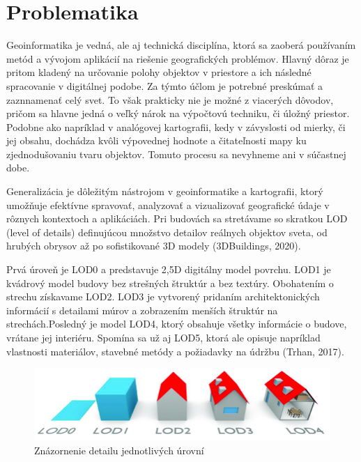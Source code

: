 \documentclass[12pt]{article}
\begin{document}
\newpage

\section*{Problematika}
Geoinformatika je vedná, ale aj technická disciplína, ktorá sa zaoberá používaním metód a vývojom aplikácií na riešenie geografických problémov. Hlavný dôraz je pritom kladený na určovanie polohy objektov v priestore a ich následné spracovanie v digitálnej podobe. Za týmto účlom je potrebné  preskúmať a zaznnamenať celý svet. To však prakticky nie je možné z viacerých dôvodov, pričom sa hlavne jedná o veľký nárok na výpočtovú techniku, či úložný priestor. Podobne ako napríklad v analógovej kartografii, kedy v závyslosti od mierky, či jej obsahu, dochádza kvôli výpovednej hodnote  a čitateľnosti mapy  ku zjednodušovaniu tvaru objektov. Tomuto procesu sa nevyhneme ani v súčastnej dobe.

Generalizácia je dôležitým nástrojom v geoinformatike a kartografii, ktorý umožňuje efektívne spravovať, analyzovať a vizualizovať geografické údaje v rôznych kontextoch a aplikáciách. Pri budovách sa stretávame so skratkou LOD (level of details) definujúcou množstvo detailov reálnych objektov sveta, od hrubých obrysov až po sofistikované 3D modely (3DBuildings, 2020). \par Prvá úroveň je LOD0 a predstavuje 2,5D digitálny model povrchu. LOD1 je kvádrový model budovy bez strešných štruktúr a bez textúry. Obohatením o strechu získavame LOD2. LOD3 je vytvorený pridaním architektonických informácií s detailami múrov a zobrazením menších štruktúr na strechách.Posledný je model LOD4, ktorý obsahuje všetky informácie o budove, vrátane jej interiéru. Spomína sa už aj LOD5, ktorá ale opisuje napríklad vlastnosti materiálov, stavebné metódy a požiadavky na údržbu (Trhan, 2017).
\begin{figure} [h]
    \centering
    \includegraphics[width=0.7\linewidth]{latex/image/lod.png}
    \caption{Znázornenie detailu jednotlivých úrovní}
    \label{fig:enter-label}
\end{figure}
\end{document}
